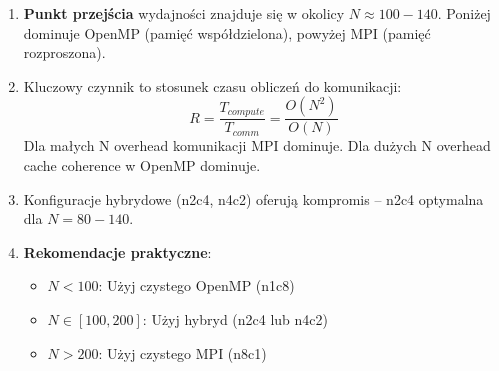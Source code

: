 \begin{enumerate}
    \item \textbf{Punkt przejścia} wydajności znajduje się w okolicy $N \approx 100-140$. Poniżej dominuje OpenMP (pamięć współdzielona), powyżej MPI (pamięć rozproszona).
    
    \item Kluczowy czynnik to stosunek czasu obliczeń do komunikacji:
    \begin{equation}
        R = \frac{T_{compute}}{T_{comm}} = \frac{O(N^2)}{O(N)}
    \end{equation}
    Dla małych N overhead komunikacji MPI dominuje. Dla dużych N overhead cache coherence w OpenMP dominuje.
    
    \item Konfiguracje hybrydowe (n2c4, n4c2) oferują kompromis -- n2c4 optymalna dla $N=80-140$.
    
    \item \textbf{Rekomendacje praktyczne}:
    \begin{itemize}
        \item $N < 100$: Użyj czystego OpenMP (n1c8)
        \item $N \in [100, 200]$: Użyj hybryd (n2c4 lub n4c2)
        \item $N > 200$: Użyj czystego MPI (n8c1)
    \end{itemize}
\end{enumerate}
